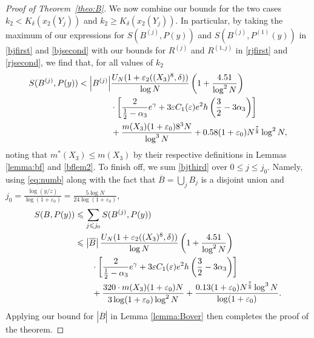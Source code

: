 \documentclass[12pt]{amsart}
\begin{document}
\begin{proof}[Proof of Theorem~\ref{theo:B}]
We now combine our bounds for the two cases $k_2<K_{\delta}(x_2(Y_j))$ and $k_2\ge K_{\delta}(x_2(Y_j))$. In particular, by taking the maximum of our expressions for $S(B^{(j)},P(y))$ and $S(B^{(j)},P^{(1)}(y))$ in \eqref{bjfirst} and \eqref{bjsecond} with our bounds for $R^{(j)}$ and $R^{(1,j)}$ in \eqref{rjfirst} and \eqref{rjsecond}, we find that, for all values of $k_2$
\begin{align}\label{bjthird}
    S(B^{(j)},P(y))<\left|B^{(j)}\right|&\frac{U_N(1+\varepsilon_2((X_3)^8,\delta))}{\log N}\left( 1+\frac{4.51}{\log^2N}\right)\\
    &\cdot\left[\frac{2}{\frac{1}{2}-\alpha_3} e^{\gamma}+3\varepsilon C_{1}(\varepsilon) e^2h\left(\frac{3}{2}-3\alpha_3\right)\right]\\
    &+\frac{m(X_3)(1+\varepsilon_0)8^3N}{\log^3 N}+0.58(1+\varepsilon_0)N^{\frac{7}{8}}\log^2 N,\notag
\end{align}
noting that $m^*(X_3)\le m(X_3)$ by their respective definitions in Lemmas \ref{lemma:bf} and \ref{bflem2}. To finish off, we sum \eqref{bjthird} over $0\le j\le j_0$. Namely, using \eqref{eq:numb} along with the fact that $\overline{B}=\bigcup_j B_j$ is a disjoint union and $j_0=\frac{\log(y/z)}{\log(1+\varepsilon_0)}=\frac{5\log N}{24\log(1+\varepsilon_0)}$,
\begin{align*}
    S(B,P(y))&\le\sum_{j\le j_0} S(B^{(j)},P(y))\notag\\
    &\le \left|\overline{B}\right|\frac{U_N(1+\varepsilon_2((X_3)^8,\delta))}{\log N}\left( 1+\frac{4.51}{\log^2N}\right)\notag\\
    &\qquad\cdot\left[\frac{2}{\frac{1}{2}-\alpha_3} e^{\gamma}+3\varepsilon C_{1}(\varepsilon) e^2h\left(\frac{3}{2}-3\alpha_3\right)\right]\notag\\
    &\qquad+\frac{320\cdot m(X_3)(1+\varepsilon_0)N}{3\log(1+\varepsilon_0)\log^2 N}+\frac{0.13(1+\varepsilon_0)N^{\frac{7}{8}}\log^3 N}{\log(1+\varepsilon_0)}.
\end{align*}
Applying our bound for $|\overline{B}|$ in Lemma \ref{lemma:Bover} then completes the proof of the theorem.
\end{proof}
\end{document}
